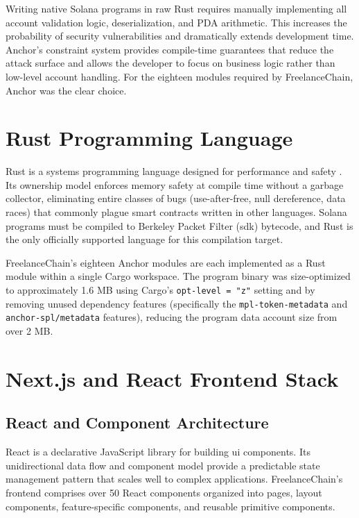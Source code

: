 Writing native Solana programs in raw Rust requires manually implementing all account validation logic, deserialization, and PDA arithmetic. This increases the probability of security vulnerabilities and dramatically extends development time. Anchor's constraint system provides compile-time guarantees that reduce the attack surface and allows the developer to focus on business logic rather than low-level account handling. For the eighteen modules required by FreelanceChain, Anchor was the clear choice.

\section{Rust Programming Language}
\label{section:3.3}

Rust is a systems programming language designed for performance and safety \cite{rust2023}. Its ownership model enforces memory safety at compile time without a garbage collector, eliminating entire classes of bugs (use-after-free, null dereference, data races) that commonly plague smart contracts written in other languages. Solana programs must be compiled to Berkeley Packet Filter (\gls{sdk}) bytecode, and Rust is the only officially supported language for this compilation target.

FreelanceChain's eighteen Anchor modules are each implemented as a Rust module within a single Cargo workspace. The program binary was size-optimized to approximately 1.6 MB using Cargo's \texttt{opt-level = "z"} setting and by removing unused dependency features (specifically the \texttt{mpl-token-metadata} and \texttt{anchor-spl/metadata} features), reducing the program data account size from over 2 MB.

\section{Next.js and React Frontend Stack}
\label{section:3.4}

\subsection{React and Component Architecture}

React \cite{react2023} is a declarative JavaScript library for building \gls{ui} components. Its unidirectional data flow and component model provide a predictable state management pattern that scales well to complex applications. FreelanceChain's frontend comprises over 50 React components organized into pages, layout components, feature-specific components, and reusable primitive components.

